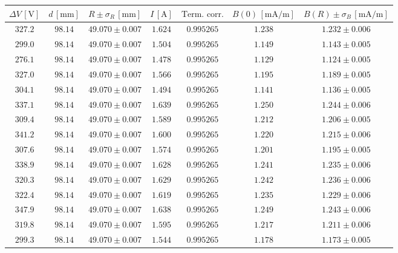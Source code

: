 \documentclass[]{article}
\begin{document}
\begin{table}[H]
    \centering

\begin{tabular}{||c|c|c|c|c|c|c||}
    \hline
    $\Delta V\, [\text{V}] $ & $d\, [\text{mm}] $ & $R \pm \sigma_R\, [\text{mm}] $ & $I\, [\text{A}] $ & $\text{Term. corr.}$ & $B(0)\, [\text{mA/m}] $ & $B(R) \pm \sigma_B\, [\text{mA/m}] $ \\
    \hline\hline

    $327.2$ & $98.14$ & $49.070 \pm 0.007$ & $1.624$ & $0.995265$ & $1.238$ & $1.232 \pm 0.006$ \\\hline
    $299.0$ & $98.14$ & $49.070 \pm 0.007$ & $1.504$ & $0.995265$ & $1.149$ & $1.143 \pm 0.005$ \\\hline
    $276.1$ & $98.14$ & $49.070 \pm 0.007$ & $1.478$ & $0.995265$ & $1.129$ & $1.124 \pm 0.005$ \\\hline
    $327.0$ & $98.14$ & $49.070 \pm 0.007$ & $1.566$ & $0.995265$ & $1.195$ & $1.189 \pm 0.005$ \\\hline
    $304.1$ & $98.14$ & $49.070 \pm 0.007$ & $1.494$ & $0.995265$ & $1.141$ & $1.136 \pm 0.005$ \\\hline
    $337.1$ & $98.14$ & $49.070 \pm 0.007$ & $1.639$ & $0.995265$ & $1.250$ & $1.244 \pm 0.006$ \\\hline
    $309.4$ & $98.14$ & $49.070 \pm 0.007$ & $1.589$ & $0.995265$ & $1.212$ & $1.206 \pm 0.005$ \\\hline
    $341.2$ & $98.14$ & $49.070 \pm 0.007$ & $1.600$ & $0.995265$ & $1.220$ & $1.215 \pm 0.006$ \\\hline
    $307.6$ & $98.14$ & $49.070 \pm 0.007$ & $1.574$ & $0.995265$ & $1.201$ & $1.195 \pm 0.005$ \\\hline
    $338.9$ & $98.14$ & $49.070 \pm 0.007$ & $1.628$ & $0.995265$ & $1.241$ & $1.235 \pm 0.006$ \\\hline
    $320.3$ & $98.14$ & $49.070 \pm 0.007$ & $1.629$ & $0.995265$ & $1.242$ & $1.236 \pm 0.006$ \\\hline
    $322.4$ & $98.14$ & $49.070 \pm 0.007$ & $1.619$ & $0.995265$ & $1.235$ & $1.229 \pm 0.006$ \\\hline
    $347.9$ & $98.14$ & $49.070 \pm 0.007$ & $1.638$ & $0.995265$ & $1.249$ & $1.243 \pm 0.006$ \\\hline
    $319.8$ & $98.14$ & $49.070 \pm 0.007$ & $1.595$ & $0.995265$ & $1.217$ & $1.211 \pm 0.006$ \\\hline
    $299.3$ & $98.14$ & $49.070 \pm 0.007$ & $1.544$ & $0.995265$ & $1.178$ & $1.173 \pm 0.005$ \\\hline

\end{tabular}
\end{table}
\end{document}
